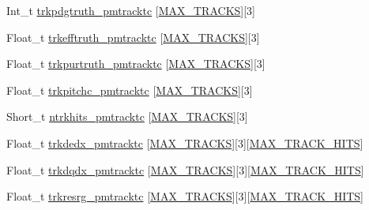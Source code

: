 \begin{DoxyCompactItemize}
\item 
Int\-\_\-t \hyperlink{classanatree_a48631f8f358d5da86116bb593b7882e5}{trkpdgtruth\-\_\-pmtracktc} \mbox{[}\hyperlink{anatree__core__v09410002__orig_8h_a327fd4e796e4a0d78947524c96e4362e}{M\-A\-X\-\_\-\-T\-R\-A\-C\-K\-S}\mbox{]}\mbox{[}3\mbox{]}
\item 
Float\-\_\-t \hyperlink{classanatree_a04e336aa3d32304ac0036dfab7dbd11e}{trkefftruth\-\_\-pmtracktc} \mbox{[}\hyperlink{anatree__core__v09410002__orig_8h_a327fd4e796e4a0d78947524c96e4362e}{M\-A\-X\-\_\-\-T\-R\-A\-C\-K\-S}\mbox{]}\mbox{[}3\mbox{]}
\item 
Float\-\_\-t \hyperlink{classanatree_a489a3d21d6372888890032f2e566fed4}{trkpurtruth\-\_\-pmtracktc} \mbox{[}\hyperlink{anatree__core__v09410002__orig_8h_a327fd4e796e4a0d78947524c96e4362e}{M\-A\-X\-\_\-\-T\-R\-A\-C\-K\-S}\mbox{]}\mbox{[}3\mbox{]}
\item 
Float\-\_\-t \hyperlink{classanatree_a883bde0d3ffe160c1ca7811804956109}{trkpitchc\-\_\-pmtracktc} \mbox{[}\hyperlink{anatree__core__v09410002__orig_8h_a327fd4e796e4a0d78947524c96e4362e}{M\-A\-X\-\_\-\-T\-R\-A\-C\-K\-S}\mbox{]}\mbox{[}3\mbox{]}
\item 
Short\-\_\-t \hyperlink{classanatree_a2c1291bed14180d4df5d6292b7b1e9b7}{ntrkhits\-\_\-pmtracktc} \mbox{[}\hyperlink{anatree__core__v09410002__orig_8h_a327fd4e796e4a0d78947524c96e4362e}{M\-A\-X\-\_\-\-T\-R\-A\-C\-K\-S}\mbox{]}\mbox{[}3\mbox{]}
\item 
Float\-\_\-t \hyperlink{classanatree_a18ee2ecb81bb2a92724ff7e2b16d3044}{trkdedx\-\_\-pmtracktc} \mbox{[}\hyperlink{anatree__core__v09410002__orig_8h_a327fd4e796e4a0d78947524c96e4362e}{M\-A\-X\-\_\-\-T\-R\-A\-C\-K\-S}\mbox{]}\mbox{[}3\mbox{]}\mbox{[}\hyperlink{anatree__core__v09410002__orig_8h_ae75eb9050f16aa034339f05572523070}{M\-A\-X\-\_\-\-T\-R\-A\-C\-K\-\_\-\-H\-I\-T\-S}\mbox{]}
\item 
Float\-\_\-t \hyperlink{classanatree_aa4e8ceac389407e64b9a5301f3762604}{trkdqdx\-\_\-pmtracktc} \mbox{[}\hyperlink{anatree__core__v09410002__orig_8h_a327fd4e796e4a0d78947524c96e4362e}{M\-A\-X\-\_\-\-T\-R\-A\-C\-K\-S}\mbox{]}\mbox{[}3\mbox{]}\mbox{[}\hyperlink{anatree__core__v09410002__orig_8h_ae75eb9050f16aa034339f05572523070}{M\-A\-X\-\_\-\-T\-R\-A\-C\-K\-\_\-\-H\-I\-T\-S}\mbox{]}
\item 
Float\-\_\-t \hyperlink{classanatree_a0f4da8ade2fa111900058c274e9d099a}{trkresrg\-\_\-pmtracktc} \mbox{[}\hyperlink{anatree__core__v09410002__orig_8h_a327fd4e796e4a0d78947524c96e4362e}{M\-A\-X\-\_\-\-T\-R\-A\-C\-K\-S}\mbox{]}\mbox{[}3\mbox{]}\mbox{[}\hyperlink{anatree__core__v09410002__orig_8h_ae75eb9050f16aa034339f05572523070}{M\-A\-X\-\_\-\-T\-R\-A\-C\-K\-\_\-\-H\-I\-T\-S}\mbox{]}

\end{DoxyCompactItemize}

